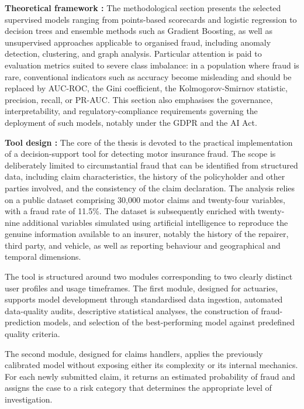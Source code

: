 \bigskip

\textbf{Theoretical framework :} The methodological section presents the selected supervised models ranging from points-based scorecards and logistic regression to decision trees and ensemble methods such as Gradient Boosting, as well as unsupervised approaches applicable to organised fraud, including anomaly detection, clustering, and graph analysis. Particular attention is paid to evaluation metrics suited to severe class imbalance: in a population where fraud is rare, conventional indicators such as accuracy become misleading and should be replaced by AUC-ROC, the Gini coefficient, the Kolmogorov-Smirnov statistic, precision, recall, or PR-AUC. This section also emphasises the governance, interpretability, and regulatory-compliance requirements governing the deployment of such models, notably under the GDPR and the AI Act.

\textbf{Tool design :} The core of the thesis is devoted to the practical implementation of a decision-support tool for detecting motor insurance fraud. The scope is deliberately limited to circumstantial fraud that can be identified from structured data, including claim characteristics, the history of the policyholder and other parties involved, and the consistency of the claim declaration. The analysis relies on a public dataset comprising 30,000 motor claims and twenty-four variables, with a fraud rate of 11.5\%. The dataset is subsequently enriched with twenty-nine additional variables simulated using artificial intelligence to reproduce the genuine information available to an insurer, notably the history of the repairer, third party, and vehicle, as well as reporting behaviour and geographical and temporal dimensions.

The tool is structured around two modules corresponding to two clearly distinct user profiles and usage timeframes. The first module, designed for actuaries, supports model development through standardised data ingestion, automated data-quality audits, descriptive statistical analyses, the construction of fraud-prediction models, and selection of the best-performing model against predefined quality criteria.

The second module, designed for claims handlers, applies the previously calibrated model without exposing either its complexity or its internal mechanics. For each newly submitted claim, it returns an estimated probability of fraud and assigns the case to a risk category that determines the appropriate level of investigation.

